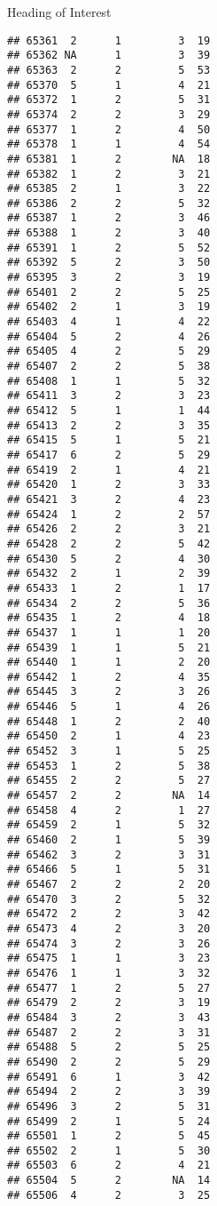 \documentclass[
  ignorenonframetext,
]{beamer}
\begin{document}
\begin{frame}[fragile]{Heading of Interest}
\begin{verbatim}
## 65361  2      1         3  19
## 65362 NA      1         3  39
## 65363  2      2         5  53
## 65370  5      1         4  21
## 65372  1      2         5  31
## 65374  2      2         3  29
## 65377  1      2         4  50
## 65378  1      1         4  54
## 65381  1      2        NA  18
## 65382  1      2         3  21
## 65385  2      1         3  22
## 65386  2      2         5  32
## 65387  1      2         3  46
## 65388  1      2         3  40
## 65391  1      2         5  52
## 65392  5      2         3  50
## 65395  3      2         3  19
## 65401  2      2         5  25
## 65402  2      1         3  19
## 65403  4      1         4  22
## 65404  5      2         4  26
## 65405  4      2         5  29
## 65407  2      2         5  38
## 65408  1      1         5  32
## 65411  3      2         3  23
## 65412  5      1         1  44
## 65413  2      2         3  35
## 65415  5      1         5  21
## 65417  6      2         5  29
## 65419  2      1         4  21
## 65420  1      2         3  33
## 65421  3      2         4  23
## 65424  1      2         2  57
## 65426  2      2         3  21
## 65428  2      2         5  42
## 65430  5      2         4  30
## 65432  2      1         2  39
## 65433  1      2         1  17
## 65434  2      2         5  36
## 65435  1      2         4  18
## 65437  1      1         1  20
## 65439  1      1         5  21
## 65440  1      1         2  20
## 65442  1      2         4  35
## 65445  3      2         3  26
## 65446  5      1         4  26
## 65448  1      2         2  40
## 65450  2      1         4  23
## 65452  3      1         5  25
## 65453  1      2         5  38
## 65455  2      2         5  27
## 65457  2      2        NA  14
## 65458  4      2         1  27
## 65459  2      1         5  32
## 65460  2      1         5  39
## 65462  3      2         3  31
## 65466  5      1         5  31
## 65467  2      2         2  20
## 65470  3      2         5  32
## 65472  2      2         3  42
## 65473  4      2         3  20
## 65474  3      2         3  26
## 65475  1      1         3  23
## 65476  1      1         3  32
## 65477  1      2         5  27
## 65479  2      2         3  19
## 65484  3      2         3  43
## 65487  2      2         3  31
## 65488  5      2         5  25
## 65490  2      2         5  29
## 65491  6      1         3  42
## 65494  2      2         3  39
## 65496  3      2         5  31
## 65499  2      1         5  24
## 65501  1      2         5  45
## 65502  2      1         5  30
## 65503  6      2         4  21
## 65504  5      2        NA  14
## 65506  4      2         3  25

\end{verbatim}
\end{frame}
\end{document}
